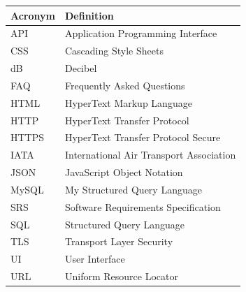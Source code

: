 \documentclass[12pt]{article}
\begin{document}
\begin{tabular}{|l|l|}
\hline
Acronym & Definition \\
\hline
API & Application Programming Interface \\
CSS & Cascading Style Sheets \\
dB & Decibel \\
FAQ & Frequently Asked Questions \\
HTML & HyperText Markup Language \\
HTTP & HyperText Transfer Protocol \\
HTTPS & HyperText Transfer Protocol Secure \\
IATA & International Air Transport Association \\
JSON & JavaScript Object Notation \\
MySQL & My Structured Query Language \\
SRS & Software Requirements Specification \\
SQL & Structured Query Language \\
TLS & Transport Layer Security \\
UI & User Interface \\
URL & Uniform Resource Locator \\
\hline
\end{tabular}
\end{document}
